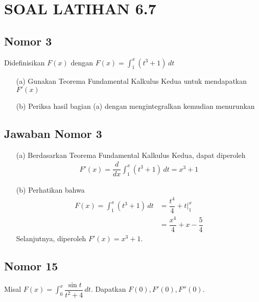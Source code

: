 \documentclass{article}
\begin{document}
\makeatletter
\renewcommand*\env@matrix[1][*\c@MaxMatrixCols c]{%
  \hskip -\arraycolsep
  \let\@ifnextchar\new@ifnextchar
  \array{#1}}
\makeatother
\newcount\arrowcount
\newcommand\arrows[1]{
        \global\arrowcount#1
        \ifnum\arrowcount>0
                \begin{matrix}[c]
                \expandafter\nextarrow
        \fi
}

\newcommand\nextarrow[1]{
        \global\advance\arrowcount-1
        \ifx\relax#1\relax\else \xrightarrow{#1}\fi
        \ifnum\arrowcount=0
                \end{matrix}
        \else
                \\
                \expandafter\nextarrow
        \fi
}
\newpage
{}
\section*{SOAL LATIHAN 6.7}
\subsection*{Nomor 3}
Didefinisikan $F(x)$ dengan $\displaystyle F(x)=\int_1^x (t^3+1)\, dt$
\begin{enumerate}
	\item[(a)] Gunakan Teorema Fundamental Kalkulus Kedua untuk mendapatkan $F'(x)$
	\item[(b)] Periksa hasil bagian (a) dengan mengintegralkan kemudian menurunkan
\end{enumerate}
\subsection*{Jawaban Nomor 3}
\begin{enumerate}
	\item[(a)] Berdasarkan Teorema Fundamental Kalkulus Kedua, dapat diperoleh 
	\begin{align*}
	F'(x) = \dfrac{d}{dx} \int_1^x (t^3+1)\, dt = x^3+1
	\end{align*}
	\item[(b)] Perhatikan bahwa 
	\begin{align*}
	F(x) = \int_1^x (t^3+1)\, dt &= \dfrac{t^4}{4}+t\bigg|^x_1\\
	&=\dfrac{x^4}{4}+x-\dfrac{5}{4}
	\end{align*}
	Selanjutnya, diperoleh $F'(x)=x^3+1$.
\end{enumerate}
\subsection*{Nomor 15}
Misal $F(x)=\displaystyle\int_0^x \dfrac{\sin t}{t^2+4}\, dt$. Dapatkan $F(0), F'(0), F''(0)$.
\end{document}
